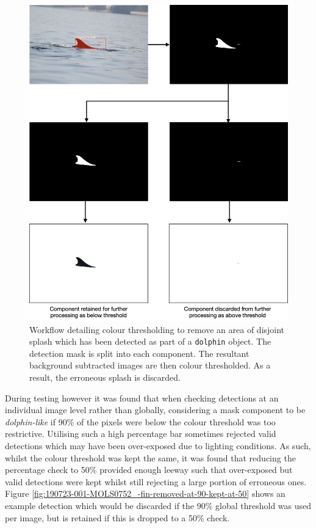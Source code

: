 \begin{figure}
	\begin{center}
		\includegraphics[scale=0.5]{Chapter3/figs/190827-001-MOLS0078_-colour-thresholding-splash-removed.png}
	\end{center}
	\caption[Workflow detailing colour thresholding to remove an area of disjoint splash which has been detected as part of a \texttt{dolphin} object.]{Workflow detailing colour thresholding to remove an area of disjoint splash which has been detected as part of a \texttt{dolphin} object. The detection mask is split into each component. The resultant background subtracted images are then colour thresholded. As a result, the erroneous splash is discarded. }\label{fig:190827-001-MOLS0078_-colour-thresholding-splash-removed}
\end{figure}

During testing however it was found that when checking detections at an individual image level rather than globally, considering a mask component to be \textit{dolphin-like} if 90\% of the pixels were below the colour threshold was too restrictive. Utilising such a high percentage bar sometimes rejected valid detections which may have been over-exposed due to lighting conditions. As such, whilst the colour threshold was kept the same, it was found that reducing the percentage check to 50\% provided enough leeway such that over-exposed but valid detections were kept whilst still rejecting a large portion of erroneous ones. Figure \ref{fig:190723-001-MOLS0752_-fin-removed-at-90-kept-at-50} shows an example detection which would be discarded if the 90\% global threshold was used per image, but is retained if this is dropped to a 50\% check.

